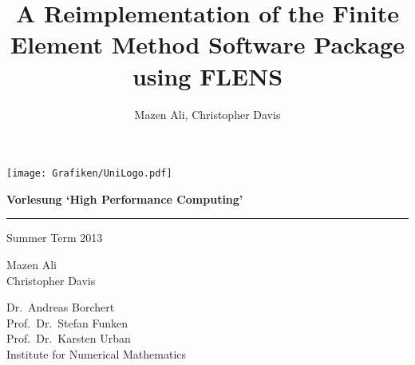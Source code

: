 \documentclass[paper=a4,11pt,oneside]{article}
\theoremstyle{definition}
\theoremstyle{remark}
\theoremstyle{definition}
\newcommand{\<}{$\langle$}
\newcommand{\>}{$\rangle$}
\begin{document}
\thispagestyle{empty}
\begin{flushright}
  \texttt{[image: Grafiken/UniLogo.pdf]}
\vspace*{85pt}


  \begin{LARGE}

    \textbf{\sc Vorlesung `High Performance Computing'}
    
    \rule{370.5pt}{5pt}

\end{LARGE}
\begin{Large}
Summer Term 2013\\
\vspace*{0.5cm}
\end{Large}
\begin{large}
Mazen Ali \\
Christopher Davis\\
\end{large}

\vspace*{330pt}

Dr.\ Andreas Borchert\\
Prof.\ Dr.\ Stefan Funken\\
Prof.\ Dr.\ Karsten Urban\\
  \vspace{8pt}
  Institute for Numerical Mathematics
 

\end{flushright}
\thispagestyle{empty} %

\newpage
{}
\title{A Reimplementation of the Finite Element Method Software Package using FLENS}
\author{Mazen Ali, Christopher Davis}
\thispagestyle{empty} 

\maketitle
\tableofcontents


\restoregeometry
{}



\end{document}
